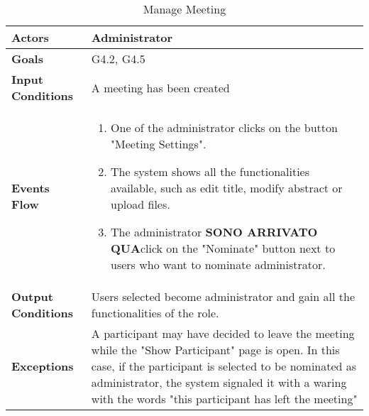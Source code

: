 \begin{table}[H]
\centering
\def\arraystretch{1.5}
\begin{tabular}{|p{7cm}|p{7cm}|}
	\hline
	\textbf{Actors}            & Administrator    \\ \hline
	\textbf{Goals}             & G4.2, G4.5           \\ \hline
	\textbf{Input Conditions}  & A meeting has been created           \\ \hline
	\textbf{Events Flow}       &  
	\begin{enumerate}[topsep=0pt, leftmargin=*]
		\item One of the administrator clicks on the button "Meeting Settings".
		\item The system shows all the functionalities available, such as edit title, modify abstract or upload files.
		\item The administrator \textbf{SONO ARRIVATO QUA}click on the "Nominate" button next to users who want to nominate administrator.
	\end{enumerate}             \\ \hline
	\textbf{Output Conditions} & Users selected become administrator and gain all the functionalities of the role.           \\ \hline
	\textbf{Exceptions}        & A participant may have decided to leave the meeting while the "Show Participant" page is open. In this case, if the participant is selected to be nominated as administrator, the system signaled it with a waring with the words "this participant has left the meeting"      \\ \hline
\end{tabular}
\caption{Manage Meeting}
\end{table}

